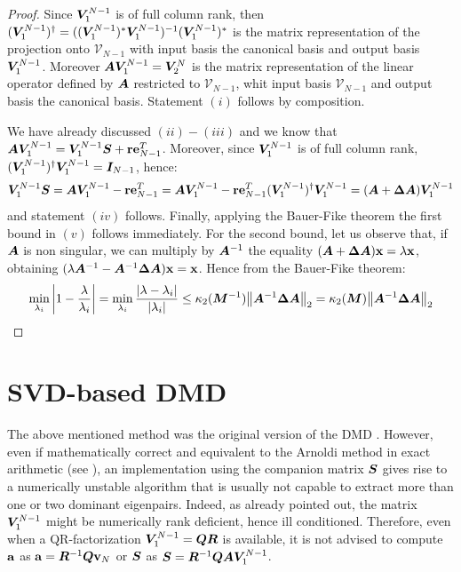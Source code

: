 \begin{proof}
Since $\vb*{V}_1^{N-1}$ is of full column rank, then $(\vb*{V}_1^{N-1})^{\dagger} = ((\vb*{V}_1^{N-1})^{*}\vb*{V}_1^{N-1})^{-1}(\vb*{V}_1^{N-1})^{*}$ is the matrix representation of the projection onto $\mathcal{V}_{N-1}$ with input basis the canonical basis and output basis $\vb*{V}_1^{N-1}$. Moreover $\vb*{A}\vb*{V}_1^{N-1} = \vb*{V}_2^{N}$ is the matrix representation of the linear operator defined by $\vb*{A}$ restricted to $\mathcal{V}_{N-1}$, whit input basis $\mathcal{V}_{N-1}$ and output basis the canonical basis. Statement $(i)$ follows by composition.

We have already discussed $(ii)-(iii)$ and we know that $\vb*{A}\vb*{V}_1^{N-1}  = \vb*{V}_1^{N-1}\vb*{S} + \vb{r}\vb{e}_{N-1}^T$. Moreover, since $\vb*{V}_1^{N-1}$ is of full column rank, $(\vb*{V}_1^{N-1})^{\dagger}\vb*{V}_1^{N-1} = \vb*{I}_{N-1}$, hence:
\begin{equation*}
    \vb*{V}_1^{N-1}\vb*{S} = \vb*{A}\vb*{V}_1^{N-1} - \vb{r}\vb{e}_{N-1}^T = \vb*{A}\vb*{V}_1^{N-1} - \vb{r}\vb{e}_{N-1}^T (\vb*{V}_1^{N-1})^{\dagger}\vb*{V}_1^{N-1}  = (\vb*{A} + \vb*{\Delta A})\vb*{V}_1^{N-1} 
\end{equation*}
and statement $(iv)$ follows. Finally, applying the Bauer-Fike theorem \cite{golub_matrix_2013} the first bound in $(v)$ follows immediately. For the second bound, let us observe that, if $\vb*{A}$ is non singular, we can multiply by $\vb*{A}^{-1}$ the equality $(\vb*{A} + \vb*{\Delta A})\vb{x} = \lambda \vb{x}$, obtaining $(\lambda \vb*{A}^{-1}  - \vb*{A}^{-1}\vb*{\Delta A})\vb{x} = \vb{x}$. Hence from the Bauer-Fike theorem:
\begin{equation*}
    \min_{\lambda_i}\abs{1 - \frac{\lambda}{\lambda_i}} = \min_{\lambda_i}\frac{\abs{\lambda - \lambda_i}}{\abs{\lambda_i}} \leq  \kappa_2(\vb*{M}^{-1})\norm{\vb*{A}^{-1}\vb*{\Delta A}}_2 = \kappa_2(\vb*{M})\norm{\vb*{A}^{-1}\vb*{\Delta A}}_2
\end{equation*}
\end{proof}

\section{SVD-based DMD}
The above mentioned method was the original version of the DMD \cite{schmid_dynamic_2010}. However, even if mathematically correct and equivalent to the Arnoldi method in exact arithmetic (see ), an implementation using the companion matrix $\vb*{S}$ gives rise to a numerically unstable algorithm that is usually not capable to extract more than one or two dominant eigenpairs. Indeed, as already pointed out, the matrix $\vb*{V}_1^{N-1}$ might be numerically rank deficient, hence ill conditioned. Therefore, even when a QR-factorization $\vb*{V}_1^{N-1} = \vb*{Q}\vb*{R}$ is available, it is not advised to compute $\vb{a}$ as $\vb{a} = \vb*{R}^{-1}\vb*{Q}\vb{v}_N$ or $\vb*{S}$ as $\vb*{S} = \vb*{R}^{-1}\vb*{Q}\vb*{A}\vb*{V}_1^{N-1}$. 

